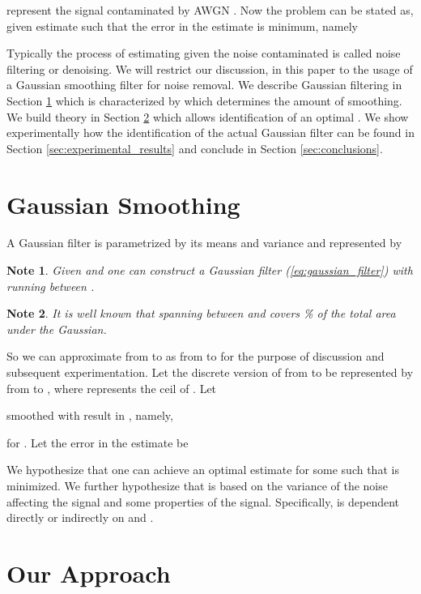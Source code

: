 \documentclass[journal,onecolumn]{IEEEtran}
\newtheorem{mynote}{Note}
\begin{document}
represent the signal  
contaminated by AWGN . 
Now the problem can be stated as, given 
 estimate  such that the error in the 
estimate is minimum, namely 
  
Typically the process of 
estimating  given the noise contaminated 
 is called noise filtering or denoising. 
We will restrict our 
discussion, in this paper to the usage of a Gaussian smoothing filter for noise 
removal.
We 
describe Gaussian 
filtering in Section \ref{sec:gaussian_filtering} which is characterized 
by  which determines the amount of smoothing. We build theory 
in Section \ref{sec:our_approach} 
which allows identification of an optimal . We show 
experimentally how the identification of the actual Gaussian filter can 
be found in Section \ref{sec:experimental_results} and conclude in 
Section \ref{sec:conclusions}.


\section{Gaussian Smoothing}
\label{sec:gaussian_filtering}


A Gaussian filter is parametrized by its means  and variance 
 and represented by
 
\begin{mynote}
Given  and  one can construct a Gaussian filter 
(\ref{eq:gaussian_filter}) with  running between .  
\end{mynote}
\begin{mynote}
It 
is well known that spanning  between  and  
covers  \% of the total area under the Gaussian. 
\end{mynote}
So we can approximate 
 from  to  
as
 from  to  
for the purpose of 
discussion and subsequent experimentation. Let the discrete version of 
 from  to  
be 
represented by 
  from 
 to 
, where  represents the ceil
of .
Let 
 
smoothed with  
result in , 
namely, 
  
 for . Let the error 
in the estimate be 

We hypothesize that one can achieve an optimal estimate 
 for some  
such that  is minimized. 
We further hypothesize that
 is based on the 
variance of the noise affecting the signal and some properties of the signal. 
Specifically,  is 
dependent directly or indirectly on  and .  

\section{Our Approach}
\label{sec:our_approach}
\end{document}
